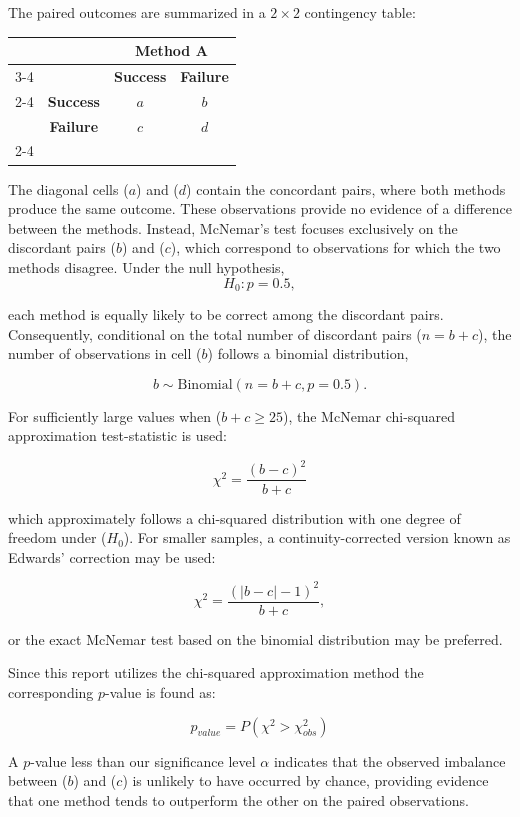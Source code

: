 \documentclass{article}
\begin{document}
The paired outcomes are summarized in a $2\times2$ contingency table:

\begin{center}
\begin{tabular}{c c c c}
&
&
\multicolumn{2}{c}{\textbf{Method A}} \\
\cline{3-4}
&
&
\textbf{Success}
&
\textbf{Failure}
\\
\cline{2-4}
\multirow{}{}{\rotatebox[origin=c]{90}{\textbf{Method B}}}
&
\textbf{Success}
&
$a$
&
$b$
\\
&
\textbf{Failure}
&
$c$
&
$d$
\\
\cline{2-4}
\end{tabular}
\end{center}

The diagonal cells ($a$) and ($d$) contain the concordant pairs, where both methods produce the same outcome. These observations provide no evidence of a difference between the methods. Instead, McNemar's test focuses exclusively on the discordant pairs ($b$) and ($c$), which correspond to observations for which the two methods disagree. Under the null hypothesis,
$$
H_0 : p = 0.5,
$$

each method is equally likely to be correct among the discordant pairs. Consequently, conditional on the total number of discordant pairs ($n=b+c$), the number of observations in cell ($b$) follows a binomial distribution,

$$
b \sim \mathrm{Binomial}(n=b+c, p=0.5).
$$

For sufficiently large values when ($b+c \ge 25$), the McNemar chi-squared approximation test-statistic is used:

$$
\chi^2=\frac{(b-c)^2}{b+c}
$$

which approximately follows a chi-squared distribution with one degree of freedom under ($H_0$). For smaller samples, a continuity-corrected version known as Edwards' correction may be used:

$$
\chi^2=\frac{(|b-c|-1)^2}{b+c},
$$

or the exact McNemar test based on the binomial distribution may be preferred.

Since this report utilizes the chi-squared approximation method the corresponding $p$-value is found as:

$$p_{value} = P(\chi^2 > \chi^2_{obs})$$

A $p$-value less than our significance level $\alpha$ indicates that the observed imbalance between ($b$) and ($c$) is unlikely to have occurred by chance, providing evidence that one method tends to outperform the other on the paired observations.
\end{document}
